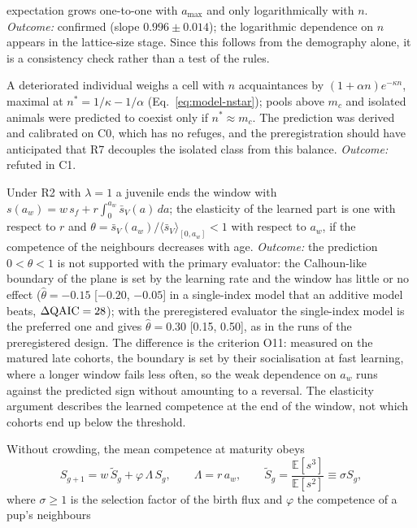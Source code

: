 \begin{description}
  expectation grows one-to-one with $a_{\max}$ and only logarithmically with $n$.
  \emph{Outcome:} confirmed (slope $0.996\pm0.014$); the logarithmic dependence on $n$ appears in the lattice-size
  stage. Since this follows from the demography alone, it is a consistency check rather than a test of the rules.
\item[Q5, preferred occupancy.] A deteriorated individual weighs a cell with $n$ acquaintances by
  $(1+\alpha n)e^{-\kappa n}$, maximal at $n^*=1/\kappa-1/\alpha$ (Eq.~\eqref{eq:model-nstar}); pools above $m_c$
  and isolated animals were predicted to coexist only if $n^*\approx m_c$. The prediction was derived and calibrated
  on \textsf{C0}, which has no refuges, and the preregistration should have anticipated that R7 decouples the
  isolated class from this balance. \emph{Outcome:} refuted in \textsf{C1}.
\item[Q6, window against rate.] Under R2 with $\lambda=1$ a juvenile ends the window with
  $s(a_w)=w\,s_f+r\int_0^{a_w}\bar s_V(a)\,da$; the elasticity of the learned part is one with respect to $r$ and
  $\theta=\bar s_V(a_w)/\langle\bar s_V\rangle_{[0,a_w]}<1$ with respect to $a_w$, if the competence of the
  neighbours decreases with age.
  \emph{Outcome:} the prediction $0<\theta<1$ is not supported with the primary evaluator: the Calhoun-like boundary
  of the plane is set by the learning rate and the window has little or no effect ($\hat\theta=-0.15$
  [$-0.20$, $-0.05$] in a single-index model that an additive model beats, $\Delta{\rm QAIC}=28$); with the
  preregistered evaluator the single-index model is the preferred one and gives $\hat\theta=0.30$ [0.15, 0.50], as in
  the runs of the preregistered design. The difference is the criterion O11: measured on the matured late cohorts, the boundary is set by their
  socialisation at fast learning, where a longer window fails less often, so the weak dependence on $a_w$ runs
  against the predicted sign without amounting to a reversal. The elasticity argument describes the learned
  competence at the end of the window, not which cohorts end up below the threshold.
\item[Q7, generational map.] Without crowding, the mean competence at maturity obeys
  \begin{equation}
    S_{g+1}=w\,\tilde S_g+\varphi\,\Lambda\,S_g,\qquad \Lambda=r\,a_w,\qquad
    \tilde S_g=\frac{\mathbb E[s^3]}{\mathbb E[s^2]}\equiv\sigma S_g,
    \label{eq:genmap}
  \end{equation}
  where $\sigma\ge1$ is the selection factor of the birth flux and $\varphi$ the competence of a pup's neighbours

\end{description}
